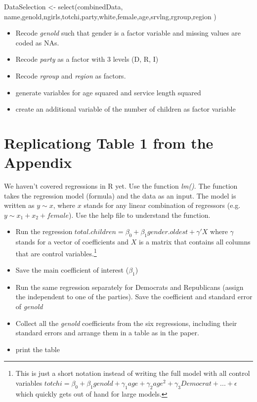 \documentclass[
]{article}
\newenvironment{Shaded}{\begin{snugshade}}{\end{snugshade}}
\newcommand{\FunctionTok}[1]{\textcolor[rgb]{0.00,0.00,0.00}{#1}}
\newcommand{\NormalTok}[1]{#1}
\newcommand{\OtherTok}[1]{\textcolor[rgb]{0.56,0.35,0.01}{#1}}
\providecommand{\tightlist}{%
  \setlength{\itemsep}{0pt}\setlength{\parskip}{0pt}}
\begin{document}
\begin{Shaded}
\begin{Highlighting}[]
\NormalTok{DataSelection }\OtherTok{\textless{}{-}} \FunctionTok{select}\NormalTok{(combinedData, name,genold,ngirls,totchi,party,white,female,age,srvlng,rgroup,region )}
\end{Highlighting}
\end{Shaded}

\begin{itemize}
\item
  Recode \emph{genold} such that gender is a factor variable and missing
  values are coded as NAs.
\item
  Recode \emph{party} as a factor with 3 levels (D, R, I)
\item
  Recode \emph{rgroup} and \emph{region} as factors.
\item
  generate variables for age squared and service length squared
\item
  create an additional variable of the number of children as factor
  variable
\end{itemize}

\hypertarget{replicationg-table-1-from-the-appendix}{%
\section{Replicationg Table 1 from the
Appendix}\label{replicationg-table-1-from-the-appendix}}

We haven't covered regressions in R yet. Use the function \emph{lm()}.
The function takes the regression model (formula) and the data as an
input. The model is written as \(y \sim x\), where \(x\) stands for any
linear combination of regressors (e.g.~\(y \sim x_1 + x_2 + female\)).
Use the help file to understand the function.

\begin{itemize}
\tightlist
\item
  Run the regression
  \(total.children = \beta_0 + \beta_1 gender.oldest + \gamma'X\) where
  \(\gamma\) stands for a vector of coefficients and \(X\) is a matrix
  that contains all columns that are control
  variables.\footnote{This is just a short notation instead of writing the full model with all control variables $totchi = \beta_0 + \beta_1 genold + \gamma_1 age + \gamma_2 age^2 + \gamma_3 Democrat + ... + \epsilon$ which quickly gets out of hand for large models.}
\item
  Save the main coefficient of interest (\(\beta_1\))
\item
  Run the same regression separately for Democrats and Republicans
  (assign the independent to one of the parties). Save the coefficient
  and standard error of \emph{genold}
\item
  Collect all the \emph{genold} coefficients from the six regressions,
  including their standard errors and arrange them in a table as in the
  paper.
\item
  print the table
\end{itemize}
\end{document}
